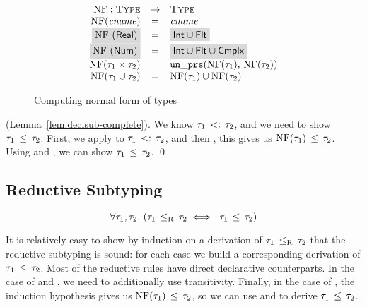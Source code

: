 \begin{figure}
  \[
	\begin{array}{rcl}
	\NF: \Type &\rightarrow& \Type \\
	\NF(\cname) &=& \cname \\
	\colorbox{light-gray}{\NF(\tyreal)} &=&
	\colorbox{light-gray}{\tyunion{\tyint}{\tyflt}} \\
	\colorbox{light-gray}{\NF(\tynum)} &=&
	\colorbox{light-gray}{\tyunion{\tyunion{\tyint}{\tyflt}}{\tycmplx}} \\
	\NF(\typair{\ty_1}{\ty_2}) &=& \unprs(\NF(\ty_1), \, \NF(\ty_2))	\\
	\NF(\tyunion{\ty_1}{\ty_2}) &=& \tyunion{\NF(\ty_1)}{\NF(\ty_2)} \\
	\end{array}
  \]
	\caption{Computing normal form of \BetaJulia types}
	\label{fig:bjsem-calc-nf}
\end{figure}

\noindent
\Proof (Lemma~\ref{lem:declsub-complete}).
We know $\tau_1 \, <: \, \tau_2$, and we need to show $\tau_1 \, \leq \, \tau_2$.
First, we apply  to $\tau_1 \, <: \, \tau_2$,
and then ,
this gives us $\mathop{\mathrm{NF}}(\tau_1) \, \leq \, \tau_2$.
Using  and , we can show
$\tau_1 \, \leq \, \tau_2$.
\qed

\subsection{Reductive Subtyping}\label{sec:declsub-correct}

\begin{theorem}\label{thm:redsub-correct}
\[
\forall \ty_1, \ty_2.\ (\bjsubr{\ty_1}{\ty_2} \iff\ \bjsub{\ty_1}{\ty_2})
\]
\end{theorem}

It is relatively easy to show by induction on a derivation of
$\tau_1 \, \leq_\mathrm{R} \, \tau_2$ that the reductive subtyping is sound:
for each case we build a corresponding derivation of $\tau_1 \, \leq \, \tau_2$.
Most of the reductive rules have direct declarative counterparts.
In the case of  and , 
we need to additionally use transitivity.
Finally, in the case of , the induction hypothesis gives us
$\mathop{\mathrm{NF}}(\tau_1) \, \leq \, \tau_2$, so we can use 
 and  to derive $\tau_1 \, \leq \, \tau_2$.

